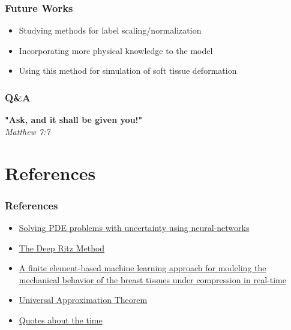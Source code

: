 \documentclass{beamer}
\begin{document}
\begin{frame}
	\frametitle{Future Works}
	\begin{itemize}
		\item <1- > Studying methods for label scaling/normalization
		\item <2- > Incorporating more physical knowledge to the model
		\item <3- > Using this method for simulation of soft tissue deformation
	\end{itemize}
\end{frame}

\begin{frame}
  \frametitle{Q\&A}
\textbf{"Ask, and it shall be given you!"}\centering\\
\em Matthew 7:7
\end{frame}
\section{References}
\begin{frame}
	\frametitle{References}
	\begin{itemize}
		\item \href{https://www.semanticscholar.org/paper/Solving-PDE-problems-with-uncertainty-using-Khoo-Lu/ffacc17153bf122cc8a726adca6b468cd5fecb54}{Solving PDE problems with uncertainty using neural-networks}
		\item \href{https://arxiv.org/pdf/1710.00211.pdf}{The Deep Ritz Method}
		\item \href{https://www.sciencedirect.com/science/article/abs/pii/S0010482517303177}{A finite element-based machine learning approach for modeling the mechanical behavior of the breast tissues under compression in real-time}
		\item \href{https://en.wikipedia.org/wiki/Universal_approximation_theorem}{Universal Approximation Theorem}
		\item \href{https://www.actitime.com/time-management/best-time-quotes/}{Quotes about the time}	
\end{itemize}
\end{frame}
\end{document}
